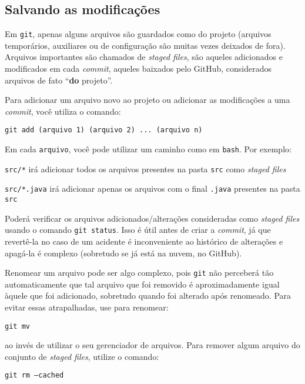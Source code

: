 \documentclass[a4paper,oneside,10pt]{memoir}
\begin{document}
\subsection{Salvando as modificações}

Em \texttt{git}, apenas alguns arquivos são guardados como do projeto (arquivos
temporários, auxiliares ou de configuração são muitas vezes deixados de fora).
Arquivos importantes são chamados de \emph{staged files}, são aqueles
adicionados e modificados em cada \emph{commit}, aqueles baixados pelo GitHub,
considerados arquivos de fato ``\textbf{do} projeto''.

Para adicionar um arquivo novo ao projeto ou adicionar as modificações a uma
\emph{commit}, você utiliza o comando:

\begin{center}
\texttt{git add (arquivo 1) (arquivo 2) ... (arquivo n)}
\end{center}

Em cada \texttt{arquivo}, você pode utilizar um caminho como em \texttt{bash}.
Por exemplo:

\begin{center}
\texttt{src/*} irá adicionar todos os arquivos presentes na pasta \texttt{src}
como \emph{staged files}

\texttt{src/*.java} irá adicionar apenas os arquivos com o final \texttt{.java}
presentes na pasta \texttt{src}
\end{center}

Poderá verificar os arquivos adicionados/alterações consideradas como
\emph{staged files} usando o comando \texttt{git status}. Isso é útil antes de
criar a \emph{commit}, já que revertê-la no caso de um acidente é inconveniente
ao histórico de alterações e apagá-la é complexo (sobretudo se já está na
nuvem, no GitHub).

Renomear um arquivo pode ser algo complexo, pois \texttt{git} não perceberá tão
automaticamente que tal arquivo que foi removido é aproximadamente igual àquele
que foi adicionado, sobretudo quando foi alterado após renomeado. Para evitar
essas atrapalhadas, use para renomear:

\begin{center}
\texttt{git mv}
\end{center}

ao invés de utilizar o seu gerenciador de arquivos. Para remover algum arquivo
do conjunto de \emph{staged files}, utilize o comando:

\begin{center}
\texttt{git rm --cached}
\end{center}
\end{document}
